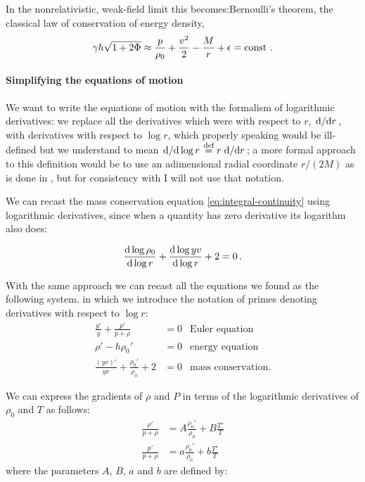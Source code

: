 \documentclass[main.tex]{subfiles}
\begin{document}
In the nonrelativistic, weak-field limit this becomes:Bernoulli's theorem, the classical law of conservation of energy density,
%
\begin{equation}
    \gamma h \sqrt{1+2\Phi} \approx \frac{p}{\rho_0} + \frac{v^2}{2} - \frac{M}{r} + \epsilon = \const \,.
\end{equation}

\paragraph{Simplifying the equations of motion} \label{par:adiabatic-equations-of-motion}

We want to write the equations of motion with the formalism of logarithmic derivatives: we replace all the derivatives which were with respect to \(r\),  \(\dv*{}{r} \), with derivatives with respect to \(\log r \), which properly speaking would be ill-defined but we understand to mean \(\dv*{}{\log r} \stackrel{\text{def}}{=} r \dv*{}{r} \); a more formal approach to this definition would be to use an adimensional radial coordinate \(r/(2M)\) as is done in \cite[]{NobiliTurollaZampieri:1991dec}, but for consistency with \cite[]{Nobili:2000} I will not use that notation.

We can recast the mass conservation equation \eqref{eq:integral-continuity} using logarithmic derivatives, since when a quantity has zero derivative its logarithm also does:

\begin{equation} \label{eq:differential-continuity}
  \dv{\log \rho_0}{\log r} +
  \dv{\log yv}{\log r} + 2 = 0 \,.
\end{equation}

With the same approach we can recast all the equations we found as the following system, in which we introduce the notation of primes denoting derivatives with respect to \(\log r\):
%
\begin{subequations}
\begin{align}
  \frac{y'}{y} + \frac{p'}{p + \rho}  &= 0 & \text{Euler equation} \label{eq:accretion-euler}  \\
  \rho' - h \rho_0' &= 0  & \text{energy equation}  \label{eq:accretion-energy}\\
  \frac{(yv)'}{yv} + \frac{\rho_0'}{\rho_0} + 2 &=0 & \text{mass conservation.}  \label{eq:accretion-mass}
\end{align}
\end{subequations}

We can express the gradients of \(\rho\) and \(P\) in terms of the logarithmic derivatives of \(\rho_0\) and \(T\) as follows:
%
\begin{subequations}
\begin{align}
  \frac{\rho'}{p+ \rho}  &= A \frac{\rho_0'}{\rho_0}
      + B \frac{T'}{T} \\
  \frac{p'}{p+ \rho}  &= a \frac{\rho_0'}{\rho_0}
      + b \frac{T'}{T}
\end{align}
\end{subequations}
%
where the parameters \(A\), \(B\), \(a\) and \(b\) are defined by:
\end{document}
